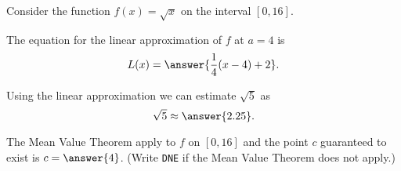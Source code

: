 \documentclass{ximera}
\author{Nela Lakos \and Kyle Parsons}
\begin{document}
\begin{exercise}

Consider the function $f(x) = \sqrt{x}$ on the interval $[0,16]$.

The equation for the linear approximation of $f$ at $a=4$ is
\[
L(x) = \answer{\frac{1}{4}(x-4)+2}.
\]

Using the linear approximation we can estimate $\sqrt{5}$ as 
\[
\sqrt{5} \approx \answer{2.25}.
\]

The Mean Value Theorem  apply to $f$ on $[0,16]$ and the point $c$ guaranteed to exist is $c=\answer{4}$. (Write \verb|DNE| if the Mean Value Theorem does not apply.)

\end{exercise}
\end{document}
